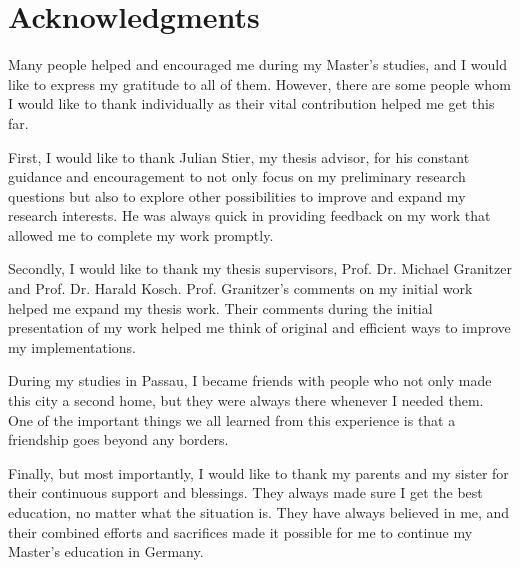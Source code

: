 \chapter*{Acknowledgments}
Many people helped and encouraged me during my Master's studies, and I would like to express my gratitude to all of them. However, there are some people whom I would like to thank individually as their vital contribution helped me get this far.

First, I would like to thank Julian Stier, my thesis advisor, for his constant guidance and encouragement to not only focus on my preliminary research questions but also to explore other possibilities to improve and expand my research interests. He was always quick in providing feedback on my work that allowed me to complete my work promptly.

Secondly, I would like to thank my thesis supervisors, Prof. Dr. Michael Granitzer and Prof. Dr. Harald Kosch. Prof. Granitzer's comments on my initial work helped me expand my thesis work. Their comments during the initial presentation of my work helped me think of original and efficient ways to improve my implementations.

During my studies in Passau, I became friends with people who not only made this city a second home, but they were always there whenever I needed them. One of the important things we all learned from this experience is that a friendship goes beyond any borders.

Finally, but most importantly, I would like to thank my parents and my sister for their continuous support and blessings. They always made sure I get the best education, no matter what the situation is. They have always believed in me, and their combined efforts and sacrifices made it possible for me to continue my Master's education in Germany.